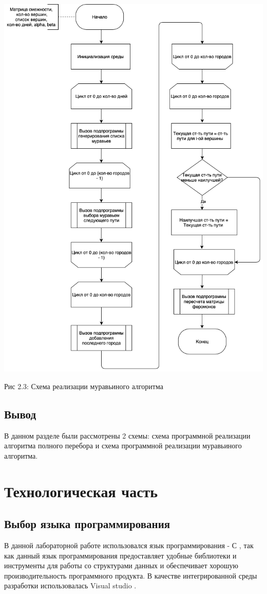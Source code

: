 \documentclass[12pt]{report}
\begin{document}
\begin{center}
		\includegraphics[scale=0.6]{schema/Ants.png}
		
			Рис 2.3: Схема реализации муравьиного алгоритма 
\end{center}


\section{Вывод}
В данном разделе были рассмотрены 2 схемы: схема программной реализации алгоритма полного перебора и схема программной реализации муравьиного алгоритма. 

\chapter{Технологическая часть}
\section{Выбор языка программирования}
В данной лабораторной работе использовался язык программирования - С \cite{C}, так как данный язык программирования предоставляет удобные библиотеки и инструменты для работы со структурами данных и обеспечивает хорошую производительность программного продукта. В качестве интегрированной среды разработки использовалась Visual studio  \cite{Vs}.  
\end{document}
